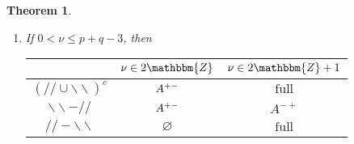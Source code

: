 \documentclass[12pt]{msjproc} %
\newcommand{\tmop}[1]{\ensuremath{\operatorname{#1}}}
\newtheorem{theorem}{Theorem}
\theoremstyle{definition}
\theoremstyle{exampstyle} \newtheorem{examp}[theorem]{Theorem}
\begin{document}
\begin{versiona}
\begin{theorem}
\begin{enumerate}
\begin{enumerate}
      \begin{center}
        \begin{center}
          \begin{center}
            \begin{center}
              \begin{tabular}{|c|c|c|}
                \hline
                & $\nu \in 2\mathbbm{Z}$ & $\nu \in 2\mathbbm{Z}+ 1$\\
                \hline
                $(/ / \cup \backslash\backslash)^c$ & $A^{\noplus + +}$ &
                $\tmop{full}$\\
                \hline
                $\backslash\backslash - / /$ & $A^{\noplus + +}$ & $A^{- +}$\\
                \hline
                $/ / -\backslash\backslash$ & $\varnothing$ & $\tmop{full}$\\
                \hline
              \end{tabular}
            \end{center}
          \end{center}
        \end{center}
      \end{center}
      
      \item If $0 < \nu \leqslant p + q - 3$, then
      
      \begin{center}
        \begin{center}
          \begin{center}
            \begin{center}
              \begin{tabular}{|c|c|c|}
                \hline
                & $\nu \in 2\mathbbm{Z}$ & $\nu \in 2\mathbbm{Z}+ 1$\\
                \hline
                $(/ / \cup \backslash\backslash)^c$ & $A^{ + -}$ &
                $\tmop{full}$\\
                \hline
                $\backslash\backslash - / /$ & $A^{ + -}$ & $A^{- +}$\\
                \hline
                $/ / -\backslash\backslash$ & $\varnothing$ & $\tmop{full}$\\
                \hline
              \end{tabular}
            \end{center}
          \end{center}
        \end{center}
      \end{center}
      

\end{enumerate}
\end{enumerate}
\end{theorem}
\end{versiona}
\end{document}
